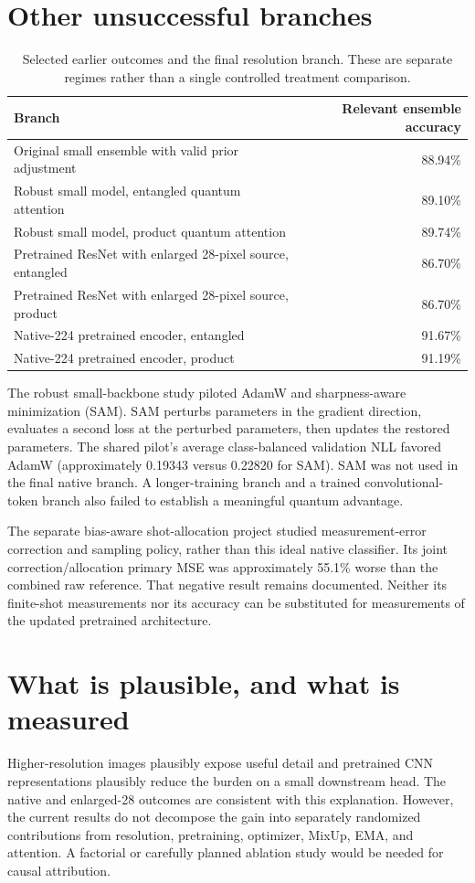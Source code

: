 \documentclass[11pt,a4paper]{report}
\begin{document}
\section{Other unsuccessful branches}
\begin{table}[htbp]\centering\small
\begin{tabular}{p{7.4cm}r}\toprule
Branch & Relevant ensemble accuracy\\\midrule
Original small ensemble with valid prior adjustment & 88.94\%\\
Robust small model, entangled quantum attention & 89.10\%\\
Robust small model, product quantum attention & 89.74\%\\
Pretrained ResNet with enlarged 28-pixel source, entangled & 86.70\%\\
Pretrained ResNet with enlarged 28-pixel source, product & 86.70\%\\
Native-224 pretrained encoder, entangled & 91.67\%\\
Native-224 pretrained encoder, product & 91.19\%\\\bottomrule
\end{tabular}
\caption{Selected earlier outcomes and the final resolution branch. These are separate regimes rather than a single controlled treatment comparison.}
\end{table}

The robust small-backbone study piloted AdamW and sharpness-aware minimization (SAM). SAM perturbs parameters in the gradient direction, evaluates a second loss at the perturbed parameters, then updates the restored parameters. The shared pilot's average class-balanced validation NLL favored AdamW (approximately 0.19343 versus 0.22820 for SAM). SAM was not used in the final native branch. A longer-training branch and a trained convolutional-token branch also failed to establish a meaningful quantum advantage.

The separate bias-aware shot-allocation project studied measurement-error correction and sampling policy, rather than this ideal native classifier. Its joint correction/allocation primary MSE was approximately 55.1\% worse than the combined raw reference. That negative result remains documented. Neither its finite-shot measurements nor its accuracy can be substituted for measurements of the updated pretrained architecture.

\section{What is plausible, and what is measured}
Higher-resolution images plausibly expose useful detail and pretrained CNN representations plausibly reduce the burden on a small downstream head. The native and enlarged-28 outcomes are consistent with this explanation. However, the current results do not decompose the gain into separately randomized contributions from resolution, pretraining, optimizer, MixUp, EMA, and attention. A factorial or carefully planned ablation study would be needed for causal attribution.
\end{document}
